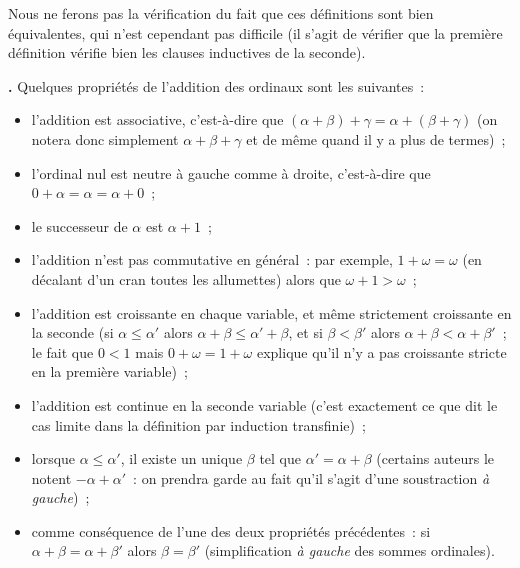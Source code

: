 \documentclass[12pt,a4paper]{article}
\theoremstyle{definition}
\newcommand\thingy{%
\refstepcounter{comcnt}\smallskip\noindent\textbf{\thecomcnt.} }
\begin{document}
Nous ne ferons pas la vérification du fait que ces définitions sont
bien équivalentes, qui n'est cependant pas difficile (il s'agit de
vérifier que la première définition vérifie bien les clauses
inductives de la seconde).

\thingy Quelques propriétés de l'addition des ordinaux sont les
suivantes :
\begin{itemize}
\item l'addition est associative, c'est-à-dire que
  $(\alpha+\beta)+\gamma = \alpha+(\beta+\gamma)$ (on notera donc
  simplement $\alpha+\beta+\gamma$ et de même quand il y a plus de
  termes) ;
\item l'ordinal nul est neutre à gauche comme à droite, c'est-à-dire
  que $0+\alpha = \alpha = \alpha+0$ ;
\item le successeur de $\alpha$ est $\alpha + 1$ ;
\item l'addition n'est pas commutative en général : par exemple,
  $1+\omega = \omega$ (en décalant d'un cran toutes les allumettes)
  alors que $\omega + 1 > \omega$ ;
\item l'addition est croissante en chaque variable, et même
  strictement croissante en la seconde (si $\alpha\leq\alpha'$ alors
  $\alpha+\beta \leq \alpha'+\beta$, et si $\beta<\beta'$ alors
  $\alpha+\beta < \alpha+\beta'$ ; le fait que $0<1$ mais $0+\omega =
  1+\omega$ explique qu'il n'y a pas croissante stricte en la première
  variable) ;
\item l'addition est continue en la seconde variable (c'est exactement
  ce que dit le cas limite dans la définition par induction
  transfinie) ;
\item lorsque $\alpha \leq \alpha'$, il existe un unique $\beta$ tel
  que $\alpha' = \alpha + \beta$ (certains auteurs le notent $-\alpha
  + \alpha'$ : on prendra garde au fait qu'il s'agit d'une
  soustraction \emph{à gauche}) ;
\item comme conséquence de l'une des deux propriétés précédentes : si
  $\alpha + \beta = \alpha + \beta'$ alors $\beta = \beta'$
  (simplification \emph{à gauche} des sommes ordinales).
\end{itemize}
\end{document}
